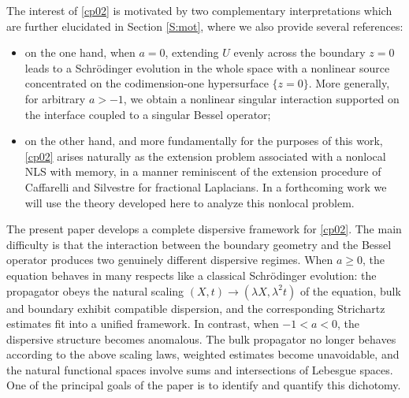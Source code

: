 \documentclass[11pt,letter]{amsart}
\newcommand{\la}{\lambda}
\numberwithin{equation}{section}
\numberwithin{equation}{section}
\begin{document}
The interest of \eqref{cp02} is motivated by two complementary interpretations which are further elucidated in Section \ref{S:mot}, where we also provide several references:
\begin{itemize}
\item[(i)] on the one hand, when $a=0$, extending $U$ evenly across the boundary $z=0$ leads to a Schr\"odinger evolution in the whole space with a nonlinear source concentrated on the codimension-one hypersurface $\{z=0\}$. More generally, for arbitrary $a>-1$, we obtain a nonlinear singular interaction supported on the interface  coupled to a singular Bessel operator; 
\item[(ii)] on the other hand, and more fundamentally for the purposes of this work, \eqref{cp02} arises naturally as the extension problem associated with a nonlocal NLS with memory, in a manner reminiscent of the extension procedure of Caffarelli and Silvestre for fractional Laplacians.
In a forthcoming work we will use the theory developed here to analyze this nonlocal problem.
\end{itemize}



 

The present paper develops a complete dispersive framework for \eqref{cp02}. The main difficulty is that the interaction between the boundary geometry and the Bessel operator produces two genuinely different dispersive regimes. When $a\ge 0$, the equation behaves in many respects like a classical Schr\"odinger evolution: the propagator obeys the natural scaling $(X,t)\to (\la X,\la^2 t)$ of the equation, bulk and boundary exhibit compatible dispersion, and the corresponding Strichartz estimates fit into a unified framework. In contrast, when $-1<a<0$, the dispersive structure becomes anomalous. The bulk propagator no longer behaves according to the above scaling laws, weighted estimates become unavoidable, and the natural functional spaces involve sums and intersections of Lebesgue spaces. One of the principal goals of the paper is to identify and quantify this dichotomy.
\end{document}
